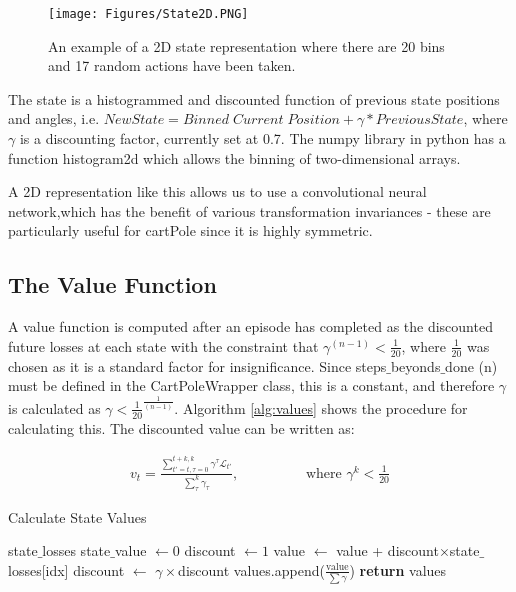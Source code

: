 \documentclass[a4paper]{article}
\newcommand{\loss}{\mathcal{L}}
\begin{document}
\begin{wrapfigure}{r}{0.35\textwidth}
   \vspace{-1cm}
   \centering
   \texttt{[image: Figures/State2D.PNG]}
   \caption{An example of a 2D state representation where there are 20 bins and 17 random actions have been taken.}
   \label{fig:state2D}
\end{wrapfigure}

The state is a histogrammed and discounted function of previous state positions and angles, i.e. $New State = Binned \; Current \; Position + \gamma * Previous State$, where $\gamma$ is a discounting factor, currently set at 0.7. The numpy library in python has a function histogram2d which allows the binning of two-dimensional arrays.

A 2D representation like this allows us to use a convolutional neural network,which has the benefit of various transformation invariances - these are particularly useful for cartPole since it is highly symmetric.

\subsection{The Value Function}

A value function is computed after an episode has completed as the discounted future losses at each state with the constraint that $\gamma^{(n-1)} < \frac{1}{20}$, where $\frac{1}{20}$ was chosen as it is a standard factor for insignificance. Since steps$\_$beyonds$\_$done (n) must be defined in the CartPoleWrapper class, this is a constant, and therefore $\gamma$ is calculated as $\gamma < \frac{1}{20}^{\frac{1}{(n-1)}}$. Algorithm \ref{alg:values} shows the procedure for calculating this. The discounted value can be written as:

\begin{align}
   v_t = \frac{\sum_{t'=t, \tau=0}^{t+k, k} \gamma^\tau \loss_{t'} }{\sum_{\tau}^k \gamma_\tau}, \hspace{2cm} \text{where } \gamma^k < \frac{1}{20}
\end{align}

\begin{algorithm}[h]
\caption{Calculate State Values}
\label{alg:values}
\begin{algorithmic}[1]
    {state$\_$losses}
      \State state$\_$value $\gets 0$ 
      \State discount $\gets 1$
         \State value $\gets$ value + discount$\times$state$\_$losses[idx]
         \State discount $\gets$ $\gamma \times $discount
      \EndFor
      \State values.append($\frac{\text{value}}{\sum \gamma}$)
   \EndFor
   \State \textbf{return} values 
   \EndProcedure
\end{algorithmic}
\end{algorithm}
\end{document}
